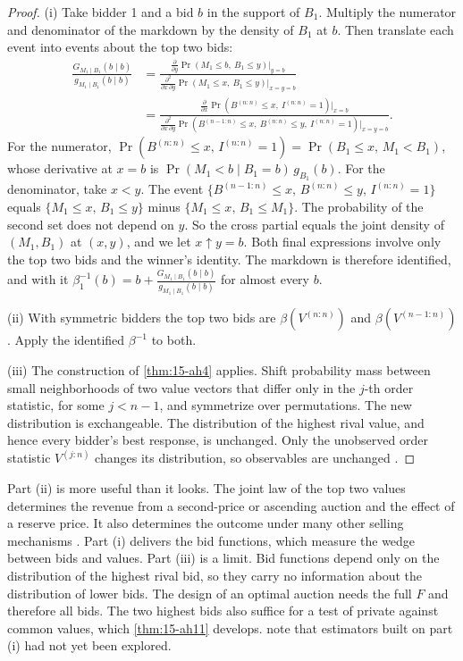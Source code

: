 \begin{proof}
(i) Take bidder 1 and a bid $b$ in the support of $B_1$. Multiply the numerator and denominator of the
markdown by the density of $B_1$ at $b$. Then translate each event into events about the top two bids:
\begin{align*}
  \frac{G_{M_1\mid B_1}(b\mid b)}{g_{M_1\mid B_1}(b\mid b)}
  &=\frac{\frac{\partial}{\partial y}\Pr\left(M_1\le b,\ B_1\le y\right)\big|_{y=b}}
  {\frac{\partial^2}{\partial x\,\partial y}\Pr\left(M_1\le x,\ B_1\le y\right)\big|_{x=y=b}}\\[2pt]
  &=\frac{\frac{\partial}{\partial x}\Pr\left(B^{(n:n)}\le x,\ I^{(n:n)}=1\right)\big|_{x=b}}
  {\frac{\partial^2}{\partial x\,\partial y}\Pr\left(B^{(n-1:n)}\le x,\ B^{(n:n)}\le y,\ I^{(n:n)}=1\right)\big|_{x=y=b}}.
\end{align*}
For the numerator, $\Pr(B^{(n:n)}\le x,\,I^{(n:n)}=1)=\Pr(B_1\le x,\,M_1<B_1)$, whose derivative at $x=b$
is $\Pr(M_1<b\mid B_1=b)\,g_{B_1}(b)$. For the denominator, take $x<y$. The event
$\{B^{(n-1:n)}\le x,\,B^{(n:n)}\le y,\,I^{(n:n)}=1\}$ equals $\{M_1\le x,\,B_1\le y\}$ minus
$\{M_1\le x,\,B_1\le M_1\}$. The probability of the second set does not depend on $y$. So the cross
partial equals the joint density of $(M_1,B_1)$ at $(x,y)$, and we let $x\uparrow y=b$. Both final
expressions involve only the top two bids and the winner's identity. The markdown is therefore identified,
and with it $\beta_1^{-1}(b)=b+\frac{G_{M_1\mid B_1}(b\mid b)}{g_{M_1\mid B_1}(b\mid b)}$ for almost every $b$.

(ii) With symmetric bidders the top two bids are $\beta(V^{(n:n)})$ and $\beta(V^{(n-1:n)})$. Apply the
identified $\beta^{-1}$ to both.

(iii) The construction of \cref{thm:15-ah4} applies. Shift probability mass between small neighborhoods of
two value vectors that differ only in the $j$-th order statistic, for some $j<n-1$, and symmetrize over
permutations. The new distribution is exchangeable. The distribution of the highest rival value, and hence
every bidder's best response, is unchanged. Only the unobserved order statistic $V^{(j:n)}$ changes its
distribution, so observables are unchanged \citep[proof of Theorem~3.4]{AtheyHaile2007}.
\end{proof}

Part (ii) is more useful than it looks. The joint law of the top two values determines the revenue from a
second-price or ascending auction and the effect of a reserve price. It also determines the outcome under
many other selling mechanisms \citep[p.~2124]{AtheyHaile2002}. Part (i) delivers the bid functions, which measure the wedge
between bids and values. Part (iii) is a limit. Bid functions depend only on the distribution of the
highest rival bid, so they carry no information about the distribution of lower bids. The design of an
optimal auction needs the full $F$ and therefore all bids. The two highest bids also suffice for a test of
private against common values, which \cref{thm:15-ah11} develops. \citet[Section~3.3.2]{AtheyHaile2007} note
that estimators built on part (i) had not yet been explored.

